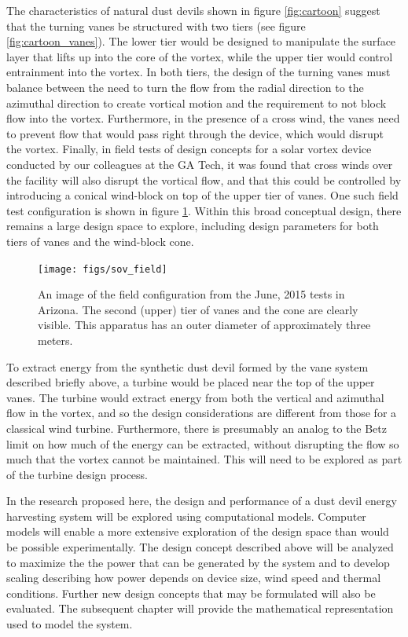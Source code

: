 The characteristics of natural dust devils shown in figure
\ref{fig:cartoon} suggest that the turning vanes be structured with two
tiers (see figure \ref{fig:cartoon_vanes}). The lower tier would be
designed to manipulate the surface layer 
that lifts up into the core of the vortex, while the upper tier would
control entrainment into the vortex. In both tiers, the design of the
turning vanes must balance between the need to turn the flow from the
radial direction to the azimuthal direction to create vortical motion
and the requirement to not block flow into the vortex. Furthermore, in
the presence of a cross wind, the vanes need to prevent flow that
would pass right through the device, which would disrupt the vortex.
Finally, in field tests of design concepts for a solar vortex device
conducted by our colleagues at the GA Tech, it was found that cross
winds over the facility will also disrupt the vortical flow, and that
this could be controlled by introducing a conical wind-block on top of
the upper tier of vanes. One such field test configuration is shown in
figure \ref{fig:field_test}. Within this broad conceptual design, there
remains a large design space to explore, including design parameters for
both tiers of vanes and the wind-block cone.

  \begin{figure}[!htb]
    \begin{center}
     \texttt{[image: figs/sov\_field]}
     \caption{An image of the field configuration from the June, 2015
     tests in Arizona. The second (upper) tier of vanes and the cone are
     clearly visible. This apparatus has an outer diameter of
     approximately three meters.}
     \label{fig:field_test}
    \end{center}
  \end{figure}

To extract energy from the synthetic dust devil formed by the vane
system described briefly above, a turbine would be placed near the top
of the upper vanes. The turbine would extract energy from both the
vertical and azimuthal flow in the vortex, and so the design
considerations are different from those for a classical wind turbine.
Furthermore, there is presumably an analog to the Betz limit on how
much of the energy can be extracted, without disrupting the flow so
much that the vortex cannot be maintained. This will need to be
explored as part of the turbine design process.

In the research proposed here, the design and performance of a dust
devil energy harvesting system will be explored using computational
models. Computer models will enable a more extensive exploration of
the design space than would be possible experimentally. The design
concept described above will be analyzed to maximize the the
power that can be generated by the system and to develop scaling
describing how power depends on device size, wind speed and thermal
conditions. Further new design concepts that may be formulated will
also be evaluated. The subsequent chapter will provide the mathematical
representation used to model the system.  

